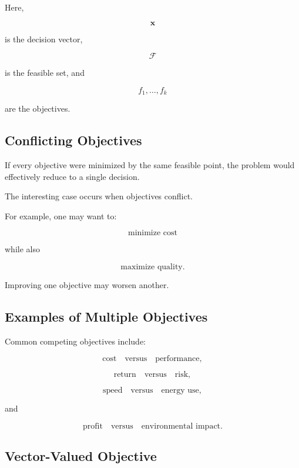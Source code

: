 Here,

\[
\mathbf{x}
\]

is the decision vector,

\[
\mathcal{F}
\]

is the feasible set, and

\[
f_1,\ldots,f_k
\]

are the objectives.

\subsection{Conflicting Objectives}
\label{subsec:conflicting-objectives}

If every objective were minimized by the same feasible point, the problem
would effectively reduce to a single decision.

The interesting case occurs when objectives conflict.

For example, one may want to:

\[
\boxed{
\text{minimize cost}
}
\]

while also

\[
\boxed{
\text{maximize quality}.
}
\]

Improving one objective may worsen another.

\subsection{Examples of Multiple Objectives}
\label{subsec:examples-multiple-objectives}

Common competing objectives include:

\[
\boxed{
\text{cost}
}
\quad\text{versus}\quad
\boxed{
\text{performance},
}
\]

\[
\boxed{
\text{return}
}
\quad\text{versus}\quad
\boxed{
\text{risk},
}
\]

\[
\boxed{
\text{speed}
}
\quad\text{versus}\quad
\boxed{
\text{energy use},
}
\]

and

\[
\boxed{
\text{profit}
}
\quad\text{versus}\quad
\boxed{
\text{environmental impact}.
}
\]

\subsection{Vector-Valued Objective}
\label{subsec:vector-valued-objective}


